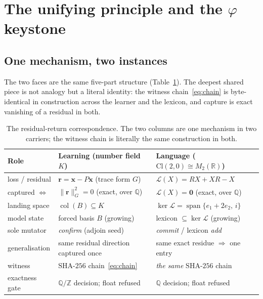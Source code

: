 \documentclass[11pt]{article}
\theoremstyle{plain}
\theoremstyle{definition}
\theoremstyle{remark}
\newcommand{\Q}{\mathbb{Q}}
\newcommand{\Z}{\mathbb{Z}}
\newcommand{\R}{\mathbb{R}}
\newcommand{\K}{K}
\newcommand{\rr}{\mathbf{r}}
\newcommand{\xx}{\mathbf{x}}
\newcommand{\GG}{G}
\newcommand{\BB}{B}
\newcommand{\Cl}{\mathrm{Cl}}
\newcommand{\Lop}{\mathcal{L}}
\newcommand{\VOID}{\mathbf{0}}
\DeclareMathOperator{\col}{col}
\DeclareMathOperator{\spn}{span}
\begin{document}
\section{The unifying principle and the \texorpdfstring{$\varphi$}{phi} keystone}\label{sec:unify}

\subsection{One mechanism, two instances}
The two faces are the same five-part structure (Table~\ref{tab:correspond}). The deepest shared piece is not
analogy but a literal identity: the witness chain~\eqref{eq:chain} is byte-identical in construction across the
learner and the lexicon, and capture is exact vanishing of a residual in both.

\begin{table}[ht]
\centering
\small
\begin{tabular}{lll}
\toprule
Role & Learning (number field $\K$) & Language ($\Cl(2,0)\cong M_2(\R)$) \\
\midrule
loss / residual & $\rr=\xx-P\xx$ (trace form $\GG$) & $\Lop(X)=RX+XR-X$ \\
captured $\iff$ & $\lVert\rr\rVert_\GG^2=0$ (exact, over $\Q$) & $\Lop(X)=\VOID$ (exact, over $\Q$) \\
landing space & $\col(\BB)\subseteq\K$ & $\ker\Lop=\spn\{e_1+2e_2,\,i\}$ \\
model state & forced basis $\BB$ (growing) & lexicon $\subseteq\ker\Lop$ (growing) \\
sole mutator & \emph{confirm} (adjoin seed) & \emph{commit} / lexicon \emph{add} \\
generalisation & same residual direction captured once & same exact residue $\Rightarrow$ one entry \\
witness & $\mathrm{SHA}\text{-}256$ chain~\eqref{eq:chain} & \emph{the same} $\mathrm{SHA}\text{-}256$ chain \\
exactness gate & $\Q/\Z$ decision; float refused & $\Q$ decision; float refused \\
\bottomrule
\end{tabular}
\caption{The residual-return correspondence. The two columns are one mechanism in two carriers; the witness
chain is literally the same construction in both.}
\label{tab:correspond}
\end{table}
\end{document}
